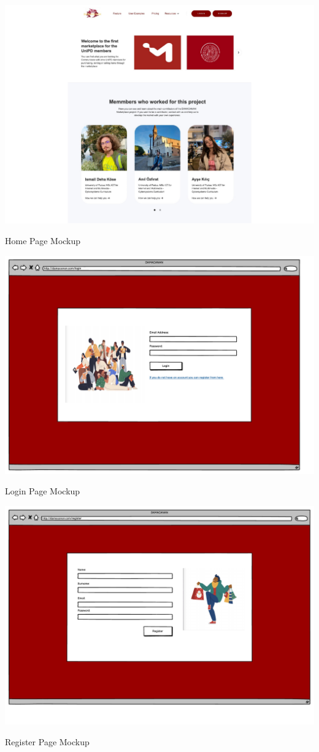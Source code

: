 \begin{center}
    \includegraphics[scale = 0.7, center]{Mockup/mockup.pdf}
\caption{Home Page Mockup}
\label{fig:my_label}



\includegraphics[scale = 0.7, center]{Mockup/Login_Page_Mockup.pdf}
\caption{Login Page Mockup}
\label{fig:my_label}




\includegraphics[scale = 0.7, center]{Mockup/Register_Page_Mockup.pdf}
\caption{Register Page Mockup}
\label{fig:my_label}





\end{center}
